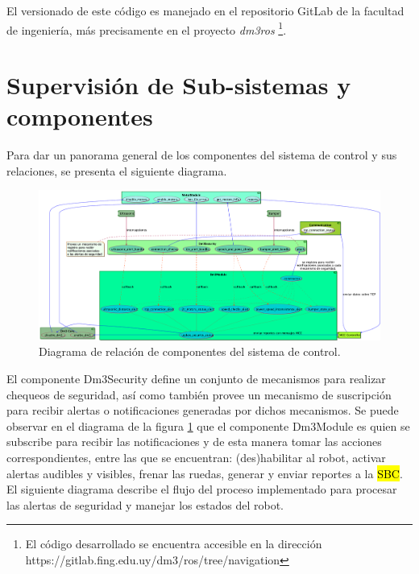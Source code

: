 \documentclass[withindex,glossary]{cam-thesis}
\begin{document}
El versionado de este código es manejado en el repositorio GitLab de la facultad de ingeniería, más precisamente en el proyecto \textit{dm3\/ros} \footnote{El código desarrollado se encuentra accesible en la dirección https://gitlab.fing.edu.uy/dm3/ros/tree/navigation}.

\section{Supervisión de Sub-sistemas y componentes} \label{sec: Implementación :: Supervisión}
Para dar un panorama general de los componentes del sistema de control y sus relaciones, se presenta el siguiente diagrama.

\begin{figure}[H]
\centering
\label{fig: Diagrama_de_subsistema_Dm3Security}
\includegraphics[width=\textwidth]{images/Diagrama_de_subsistema_Dm3Security}
\caption[Diagrama del sub-sistema Dm3Security]{Diagrama de relación de componentes del sistema de control.}
\end{figure}

El componente Dm3Security define un conjunto de mecanismos para realizar chequeos de seguridad, así como también provee un mecanismo de suscripción para recibir alertas o notificaciones generadas por dichos mecanismos. Se puede observar en el diagrama de la figura \ref{fig: Diagrama_de_subsistema_Dm3Security} que el componente Dm3Module es quien se subscribe para recibir las notificaciones y de esta manera tomar las acciones correspondientes, entre las que se encuentran: (des)habilitar al robot, activar alertas audibles y visibles, frenar las ruedas, generar y enviar reportes a la \hl{SBC}.
El siguiente diagrama describe el flujo del proceso implementado para procesar las alertas de seguridad y manejar los estados del robot.
\end{document}
